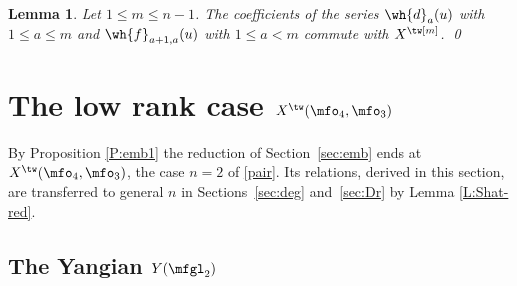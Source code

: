 \documentclass{amsart}
\newtheorem{lemma}[theorem]{Lemma}
\numberwithin{equation}{section}
\theoremstyle{remark}
\renewcommand{\,}{\kern 0.1em} %
\begin{document}
\begin{lemma} \label{L:emb-comm}
%
Let $1\le m\le n-1$. The coefficients of the series $\wh{d}_a(u)$ with $1\le a\le m$ and
$\wh{f}_{a+1,a}(u)$ with $1\le a<m$ commute with $X^{\tw[m]}$. \qed
%
\end{lemma}




\section{The low rank case $X^\tw(\mfo_4,\mfo_3)$} \label{sec:low}


By Proposition \ref{P:emb1} the reduction of Section~\ref{sec:emb} ends at $X^\tw(\mfo_4,\mfo_3)$, the
case $n=2$ of \eqref{pair}. Its relations, derived in this section, are transferred to general $n$
in Sections~\ref{sec:deg} and~\ref{sec:Dr} by Lemma \ref{L:Shat-red}.


\subsection{The Yangian $Y(\mfgl_2)$}
\end{document}

